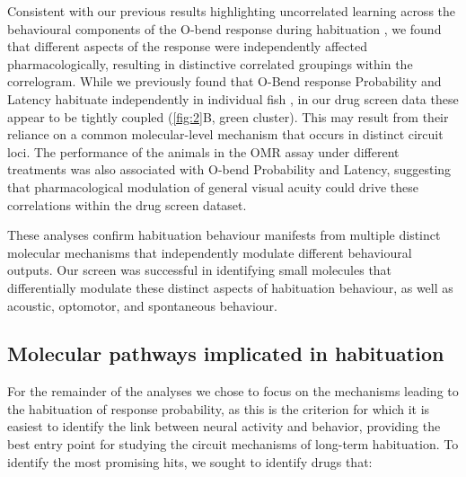 \documentclass[9pt,lineno]{RandlettLab_elife}
\begin{document}
Consistent with our previous results highlighting uncorrelated learning across the behavioural components of the O-bend response during habituation \cite{Randlett2019-fi}, we found that different aspects of the response were independently affected pharmacologically, resulting in distinctive correlated groupings within the correlogram. While we previously found that O-Bend response Probability and Latency habituate independently in individual fish \cite{Randlett2019-fi}, in our drug screen data these appear to be tightly coupled (\autoref{fig:2}B, green cluster). This may result from their reliance on a common molecular-level mechanism that occurs in distinct circuit loci. The performance of the animals in the OMR assay under different treatments was also associated with O-bend Probability and Latency, suggesting that pharmacological modulation of general visual acuity could drive these correlations within the drug screen dataset.

These analyses confirm habituation behaviour manifests from multiple distinct molecular mechanisms that independently modulate different behavioural outputs. Our screen was successful in identifying small molecules that differentially modulate these distinct aspects of habituation behaviour, as well as acoustic, optomotor, and spontaneous behaviour. 

\subsection{Molecular pathways implicated in habituation}

For the remainder of the analyses we chose to focus on the mechanisms leading to the habituation of response probability, as this is the criterion for which it is easiest to identify the link between neural activity and behavior, providing the best entry point for studying the circuit mechanisms of long-term habituation. To identify the most promising hits, we sought to identify drugs that:
\end{document}
